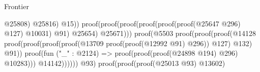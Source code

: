 \begin{lexlean}{Frontier}
\begin{coremodule}
                                                                                        @25808)
                                                                                      @25816)
                                                                                    @15))
                                                                              proof(proof(proof(proof(proof(proof(@25647
                                                                                            @296)
                                                                                          @127)
                                                                                        @10031)
                                                                                      @91)
                                                                                    @25654)
                                                                                  @25671)))
                                                                        proof(@5503
                                                                            proof(proof(proof(@14128
                                                                                    proof(proof(proof(proof(@13709
                                                                                              proof(proof(@12992
                                                                                                    @91)
                                                                                                  @296))
                                                                                            @127)
                                                                                          @132)
                                                                                        @91))
                                                                                  proof(fun ("_" : @2124) =>
                                                                                    proof(proof(proof(@24898
                                                                                            @194)
                                                                                          @296)
                                                                                        @10283)))
                                                                                @14142))))))
                                                              @93)
                                                            proof(proof(proof(@25013 @93) @13602)

\end{coremodule}
\end{lexlean}
